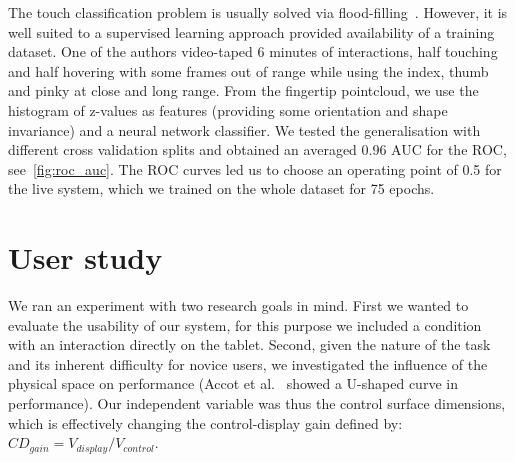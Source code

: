 \documentclass{chi-ext}
\begin{document}
The touch classification problem is usually solved via flood-filling~\cite{Harrison2011,Xiao2016}. However, it is well suited to a supervised learning approach provided availability of a training dataset. One of the authors video-taped 6 minutes of interactions, half touching and half hovering with some frames out of range while using the index, thumb and pinky at close and long range. From the fingertip pointcloud, we use the histogram of z-values as features (providing some orientation and shape invariance) and a neural network classifier. We tested the generalisation with different cross validation splits and obtained an averaged 0.96 AUC for the ROC, see~\autoref{fig:roc_auc}. The ROC curves led us to choose an operating point of 0.5 for the live system, which we trained on the whole dataset for 75 epochs.




\section{User study}
We ran an experiment with two research goals in mind. First we wanted to evaluate the usability of our system, for this purpose we included a condition with an interaction directly on the tablet. Second, given the nature of the task and its inherent difficulty for novice users, we investigated the influence of the physical space on performance (Accot et al.~\cite{Accot2001} showed a U-shaped curve in performance). Our independent variable was thus the control surface dimensions, which is effectively changing the control-display gain defined by: $CD_{gain} = V_{display}/V_{control}$.
\end{document}
